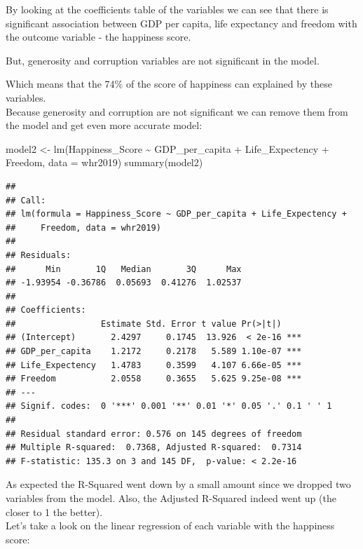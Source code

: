 \documentclass[
]{article}
\newenvironment{Shaded}{\begin{snugshade}}{\end{snugshade}}
\newcommand{\AttributeTok}[1]{\textcolor[rgb]{0.77,0.63,0.00}{#1}}
\newcommand{\FunctionTok}[1]{\textcolor[rgb]{0.00,0.00,0.00}{#1}}
\newcommand{\NormalTok}[1]{#1}
\newcommand{\OtherTok}[1]{\textcolor[rgb]{0.56,0.35,0.01}{#1}}
\newcommand{\SpecialCharTok}[1]{\textcolor[rgb]{0.00,0.00,0.00}{#1}}
\begin{document}
By looking at the coefficients table of the variables we can see that
there is significant association between GDP per capita, life expectancy
and freedom with the outcome variable - the happiness score.

But, generosity and corruption variables are not significant in the
model.

Which means that the 74\% of the score of happiness can explained by
these variables.\\

Because generosity and corruption are not significant we can remove them
from the model and get even more accurate model:

\begin{Shaded}
\begin{Highlighting}[]
\NormalTok{model2 }\OtherTok{\textless{}{-}} \FunctionTok{lm}\NormalTok{(Happiness\_Score }\SpecialCharTok{\textasciitilde{}}\NormalTok{ GDP\_per\_capita }\SpecialCharTok{+}\NormalTok{ Life\_Expectency }\SpecialCharTok{+}\NormalTok{ Freedom, }\AttributeTok{data =}\NormalTok{ whr2019)}
\FunctionTok{summary}\NormalTok{(model2)}
\end{Highlighting}
\end{Shaded}

\begin{verbatim}
## 
## Call:
## lm(formula = Happiness_Score ~ GDP_per_capita + Life_Expectency + 
##     Freedom, data = whr2019)
## 
## Residuals:
##      Min       1Q   Median       3Q      Max 
## -1.93954 -0.36786  0.05693  0.41276  1.02537 
## 
## Coefficients:
##                 Estimate Std. Error t value Pr(>|t|)    
## (Intercept)       2.4297     0.1745  13.926  < 2e-16 ***
## GDP_per_capita    1.2172     0.2178   5.589 1.10e-07 ***
## Life_Expectency   1.4783     0.3599   4.107 6.66e-05 ***
## Freedom           2.0558     0.3655   5.625 9.25e-08 ***
## ---
## Signif. codes:  0 '***' 0.001 '**' 0.01 '*' 0.05 '.' 0.1 ' ' 1
## 
## Residual standard error: 0.576 on 145 degrees of freedom
## Multiple R-squared:  0.7368, Adjusted R-squared:  0.7314 
## F-statistic: 135.3 on 3 and 145 DF,  p-value: < 2.2e-16
\end{verbatim}

As expected the R-Squared went down by a small amount since we dropped
two variables from the model. Also, the Adjusted R-Squared indeed went
up (the closer to 1 the better).\\

Let's take a look on the linear regression of each variable with the
happiness score:
\end{document}
